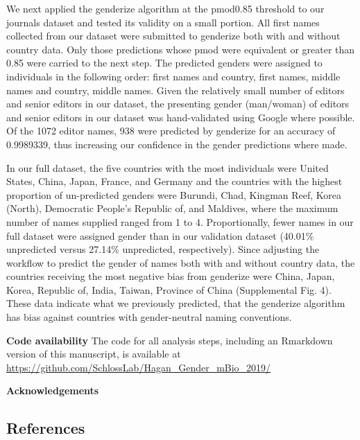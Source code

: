\documentclass[11pt,]{article}
\begin{document}
We next applied the genderize algorithm at the pmod0.85 threshold to our
journals dataset and tested its validity on a small portion. All first
names collected from our dataset were submitted to genderize both with
and without country data. Only those predictions whose pmod were
equivalent or greater than 0.85 were carried to the next step. The
predicted genders were assigned to individuals in the following order:
first names and country, first names, middle names and country, middle
names. Given the relatively small number of editors and senior editors
in our dataset, the presenting gender (man/woman) of editors and senior
editors in our dataset was hand-validated using Google where possible.
Of the 1072 editor names, 938 were predicted by genderize for an
accuracy of 0.9989339, thus increasing our confidence in the gender
predictions where made.

In our full dataset, the five countries with the most individuals were
United States, China, Japan, France, and Germany and the countries with
the highest proportion of un-predicted genders were Burundi, Chad,
Kingman Reef, Korea (North), Democratic People's Republic of, and
Maldives, where the maximum number of names supplied ranged from 1 to 4.
Proportionally, fewer names in our full dataset were assigned gender
than in our validation dataset (40.01\% unpredicted versus 27.14\%
unpredicted, respectively). Since adjusting the workflow to predict the
gender of names both with and without country data, the countries
receiving the most negative bias from genderize were China, Japan,
Korea, Republic of, India, Taiwan, Province of China (Supplemental Fig.
4). These data indicate what we previously predicted, that the genderize
algorithm has bias against countries with gender-neutral naming
conventions.

\textbf{Code availability} The code for all analysis steps, including an
Rmarkdown version of this manuscript, is available at
\url{https://github.com/SchlossLab/Hagan_Gender_mBio_2019/}

\textbf{Acknowledgements}

\subsection{References}\label{references}
\end{document}
